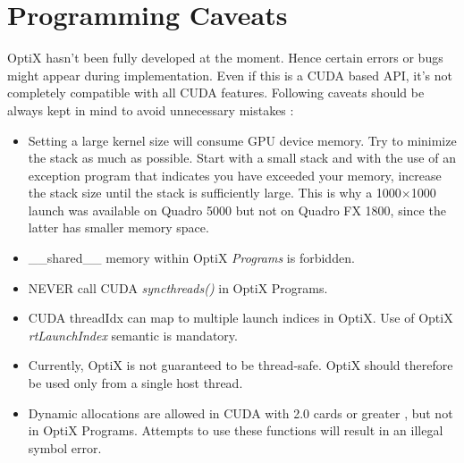 \section{Programming Caveats}
OptiX hasn't been fully developed at the moment. Hence certain errors or bugs might appear during implementation. Even if this is a CUDA based API, it's not completely compatible with all CUDA features. Following caveats should be always kept in mind to avoid unnecessary mistakes \citep{Reference6}:
\begin{itemize}
  \item Setting a large kernel size will consume GPU device memory. Try to minimize the stack as much as possible. Start with a small stack and with the use of an exception program that indicates you have exceeded your memory, increase the stack size until the stack is sufficiently large. This is why a 1000$\times$1000 launch was available on Quadro 5000 but not on Quadro FX 1800, since the latter has smaller memory space.
  \item \_\_shared\_\_ memory within OptiX \textit{Programs} is forbidden.
  \item NEVER call CUDA \textit{syncthreads()} in OptiX Programs.
  \item CUDA threadIdx can map to multiple launch indices in OptiX. Use of OptiX \textit{rtLaunchIndex} semantic is mandatory.
  \item Currently, OptiX is not guaranteed to be thread-safe. OptiX should therefore be used only from a single host thread.
  \item Dynamic allocations are allowed in CUDA with 2.0 cards or greater \citep{cudaguide}, but not in OptiX Programs. Attempts to use these functions will result in an illegal symbol error.
\end{itemize}

